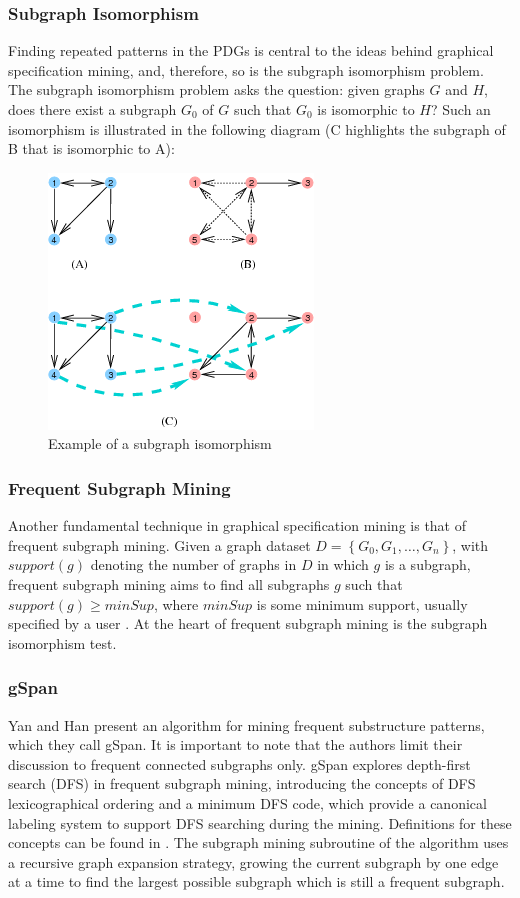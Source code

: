 \documentclass[12pt]{article}
\begin{document}
\subsubsection{Subgraph Isomorphism}
Finding repeated patterns in the PDGs is central to the ideas behind graphical
specification mining, and, therefore, so is the subgraph isomorphism problem.
The subgraph isomorphism problem asks the question: given graphs $G$ and $H$,
does there exist a subgraph $G_0$ of $G$ such that $G_0$ is isomorphic to $H$?
Such an isomorphism is illustrated in the following diagram (C highlights the 
subgraph of B that is isomorphic to A):
\begin{figure}[ht]
\centerline{
    \includegraphics{subgraph_isomorphism.png}
}
\caption{\label{subgraph_isomorphism}
    Example of a subgraph isomorphism
}
\end{figure}

\subsubsection{Frequent Subgraph Mining}
Another fundamental technique in graphical specification mining is that of
frequent subgraph mining. Given a graph dataset
$D = \left\{ G_0, G_1, \ldots, G_n\right\}$, with $support(g)$ denoting the
number of graphs in $D$ in which $g$ is a subgraph, frequent subgraph mining
aims to find all subgraphs $g$ such that $support(g) \geq minSup$, where
$minSup$ is some minimum support, usually specified by a user
\cite{Yan:2002:GGS:844380.844811}. At the heart of frequent subgraph mining is
the subgraph isomorphism test.

\subsubsection{gSpan}
Yan and Han present an algorithm for mining frequent substructure
patterns, which they call gSpan. It is important to note that the authors
limit their discussion to frequent connected subgraphs only. gSpan explores
depth-first search (DFS) in frequent subgraph mining, introducing the concepts
of DFS lexicographical ordering and a minimum DFS code, which provide a
canonical labeling system to support DFS searching during the mining.
Definitions for these concepts can be found in
\cite{Yan:2002:GGS:844380.844811}. The subgraph mining subroutine of the
algorithm uses a recursive graph expansion strategy, growing the current
subgraph by one edge at a time to find the largest possible subgraph which is
still a frequent subgraph.
\end{document}

